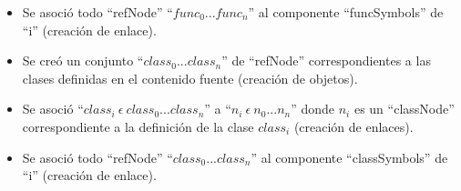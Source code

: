 \begin{framed}
\begin{description}
\begin {itemize}
         \item Se asoció todo ``refNode'' ``$func_0...func_n$'' al componente ``funcSymbols'' de ``i'' (creación de enlace). 
         \item Se creó un conjunto ``$class_0...class_n$'' de ``refNode'' correspondientes a las clases definidas en el contenido fuente (creación de objetos).
         \item Se asoció ``$class_i\ \epsilon\ class_0...class_n$'' a  ``$n_i\ \epsilon\ n_0...n_n$'' donde $n_i$ es un ``classNode'' correspondiente a la definición de la clase $class_i$ (creación de enlaces).
         \item Se asoció todo ``refNode'' ``$class_0...class_n$'' al componente ``classSymbols'' de ``i'' (creación de enlace). 
      \end{itemize}
	\end{description}
\end{framed}
\FloatBarrier
